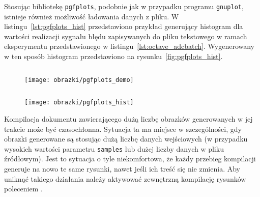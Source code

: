 Stosując bibliotekę \texttt{pgfplots}, podobnie jak w przypadku programu \texttt{gnuplot}, istnieje również możliwość ładowania danych z pliku. W listingu~\ref{lst:pgfplots_hist} przedstawiono przykład generujący histogram dla wartości realizacji sygnału błędu zapisywanych do pliku tekstowego w ramach eksperymentu przedstawionego w listingu~\ref{lst:octave_adcbatch}. Wygenerowany w ten sposób histogram przedstawiono na rysunku~\ref{fig:pgfplots_hist}.

\begin{listing}[hbt]
\inputminted{latex}{obrazki/pgfplots_demo.tex}
\end{listing}

\begin{figure}[!htb]
\texttt{[image: obrazki/pgfplots\_demo]}
\end{figure}

\begin{listing}[p]
\inputminted{latex}{obrazki/pgfplots_hist.tex}
\end{listing}

\begin{figure}[p]
\texttt{[image: obrazki/pgfplots\_hist]}
\end{figure}

Kompilacja dokumentu zawierającego dużą liczbę obrazków generowanych w jej trakcie może być czasochłonna. Sytuacja ta ma miejsce w szczególności, gdy obrazki generowane są stosując dużą liczbę danych wejściowych (w przypadku wysokich wartości parametru \texttt{samples} lub dużej liczby danych w pliku źródłowym). Jest to sytuacja o tyle niekomfortowa, że każdy przebieg kompilacji generuje na nowo te same rysunki, nawet jeśli ich treść się nie zmienia. Aby uniknąć takiego działania należy aktywować zewnętrzną kompilację rysunków poleceniem \texttt{\tikzexternalize}.

